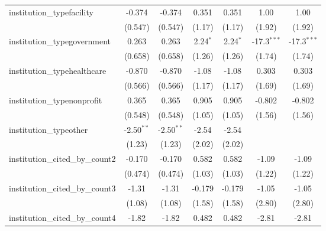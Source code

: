 \begin{tabular}{lcccccc}
   institution\_typefacility             & -0.374        & -0.374        & 0.351         & 0.351         & 1.00          & 1.00\\   
                                         & (0.547)       & (0.547)       & (1.17)        & (1.17)        & (1.92)        & (1.92)\\   
   institution\_typegovernment           & 0.263         & 0.263         & 2.24$^{*}$    & 2.24$^{*}$    & -17.3$^{***}$ & -17.3$^{***}$\\   
                                         & (0.658)       & (0.658)       & (1.26)        & (1.26)        & (1.74)        & (1.74)\\   
   institution\_typehealthcare           & -0.870        & -0.870        & -1.08         & -1.08         & 0.303         & 0.303\\   
                                         & (0.566)       & (0.566)       & (1.17)        & (1.17)        & (1.69)        & (1.69)\\   
   institution\_typenonprofit            & 0.365         & 0.365         & 0.905         & 0.905         & -0.802        & -0.802\\   
                                         & (0.548)       & (0.548)       & (1.05)        & (1.05)        & (1.56)        & (1.56)\\   
   institution\_typeother                & -2.50$^{**}$  & -2.50$^{**}$  & -2.54         & -2.54         &               &   \\   
                                         & (1.23)        & (1.23)        & (2.02)        & (2.02)        &               &   \\   
   institution\_cited\_by\_count2        & -0.170        & -0.170        & 0.582         & 0.582         & -1.09         & -1.09\\   
                                         & (0.474)       & (0.474)       & (1.03)        & (1.03)        & (1.22)        & (1.22)\\   
   institution\_cited\_by\_count3        & -1.31         & -1.31         & -0.179        & -0.179        & -1.05         & -1.05\\   
                                         & (1.08)        & (1.08)        & (1.58)        & (1.58)        & (2.80)        & (2.80)\\   
   institution\_cited\_by\_count4        & -1.82         & -1.82         & 0.482         & 0.482         & -2.81         & -2.81\\   

\end{tabular}
